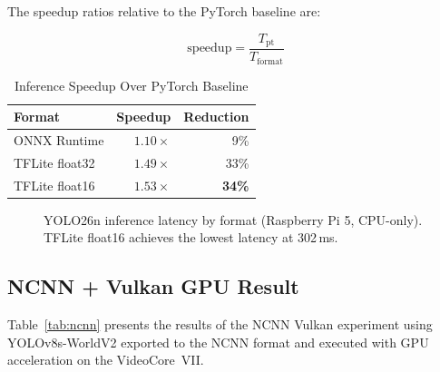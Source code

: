 \documentclass[conference]{IEEEtran}
\begin{document}
The speedup ratios relative to the PyTorch baseline are:

\begin{equation}
  \text{speedup} = \frac{T_{\text{pt}}}{T_{\text{format}}}
  \label{eq:speedup}
\end{equation}

\begin{table}[ht]
  \caption{Inference Speedup Over PyTorch Baseline}
  \label{tab:speedup}
  \centering
  \begin{tabular}{lrr}
    \toprule
    \textbf{Format} & \textbf{Speedup} & \textbf{Reduction} \\
    \midrule
    ONNX Runtime      & $1.10\times$ & 9\% \\
    TFLite float32    & $1.49\times$ & 33\% \\
    TFLite float16    & $\mathbf{1.53\times}$ & \textbf{34\%} \\
    \bottomrule
  \end{tabular}
\end{table}

\begin{figure}[ht]
  \centering
  \caption{YOLO26n inference latency by format (Raspberry Pi 5, CPU-only).
           TFLite float16 achieves the lowest latency at 302\,ms.}
  \label{fig:benchmark_bar}
\end{figure}

\subsection{NCNN + Vulkan GPU Result}

Table~\ref{tab:ncnn} presents the results of the NCNN Vulkan experiment using
YOLOv8s-WorldV2 exported to the NCNN format and executed with GPU acceleration
on the VideoCore~VII.
\end{document}
